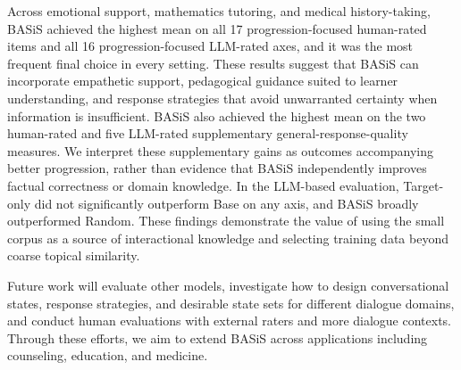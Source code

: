 \documentclass[manuscript,review,anonymous]{acmart}
\begin{document}
Across emotional support, mathematics tutoring, and medical history-taking, BASiS achieved the highest mean on all 17 progression-focused human-rated items and all 16 progression-focused LLM-rated axes, and it was the most frequent final choice in every setting. These results suggest that BASiS can incorporate empathetic support, pedagogical guidance suited to learner understanding, and response strategies that avoid unwarranted certainty when information is insufficient. BASiS also achieved the highest mean on the two human-rated and five LLM-rated supplementary general-response-quality measures. We interpret these supplementary gains as outcomes accompanying better progression, rather than evidence that BASiS independently improves factual correctness or domain knowledge. In the LLM-based evaluation, Target-only did not significantly outperform Base on any axis, and BASiS broadly outperformed Random. These findings demonstrate the value of using the small corpus as a source of interactional knowledge and selecting training data beyond coarse topical similarity.

Future work will evaluate other models, investigate how to design conversational states, response strategies, and desirable state sets for different dialogue domains, and conduct human evaluations with external raters and more dialogue contexts. Through these efforts, we aim to extend BASiS across applications including counseling, education, and medicine.




\clearpage
\appendix

\end{document}
